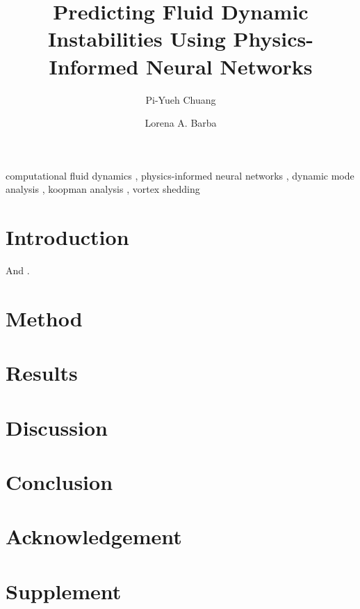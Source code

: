 \documentclass[5p, twocolumn, times, sort&compress]{elsarticle}
\begin{document}
    \begin{frontmatter}
        \title{%
            Predicting Fluid Dynamic Instabilities Using Physics-Informed Neural Networks%
        }

        \author[1]{Pi-Yueh Chuang}
        \author[1]{Lorena A. Barba}

        \begin{abstract}
            \lipsum[1]%
        \end{abstract}

        \begin{keyword}
            computational fluid dynamics \sep
            physics-informed neural networks \sep
            dynamic mode analysis \sep
            koopman analysis \sep
            vortex shedding
        \end{keyword}
    \end{frontmatter}

    \section{Introduction}
    \lipsum[1-5] And \cite{chen_variants_2012, rowley_spectral_2009, rahaman_spectral_2019}.

    \section{Method}
    

    \section{Results}
    

    \section{Discussion}
    \lipsum[5]

    \section{Conclusion}
    \lipsum[6]

    \section*{Acknowledgement}
    \lipsum[7]

    

    \appendix
    \section{Supplement}
    
\end{document}
